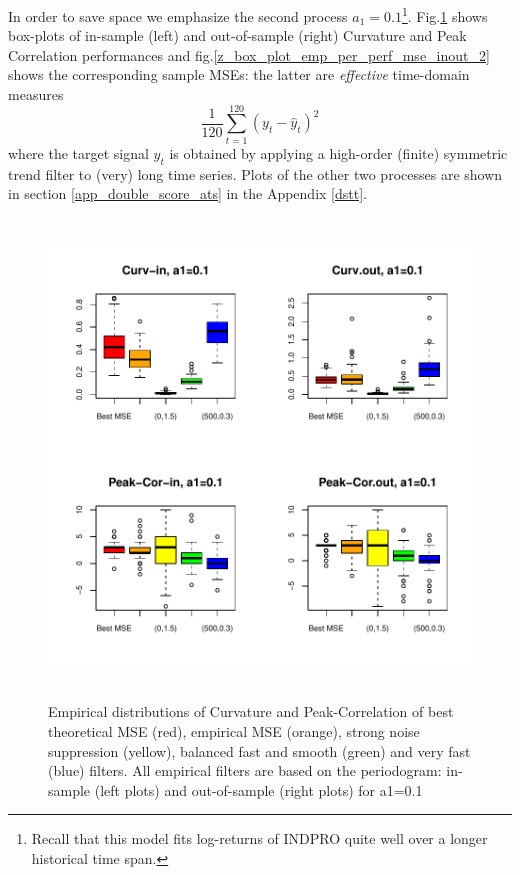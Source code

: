 \documentclass[a4paper]{book}
\begin{document}
In order to save space we emphasize the second process $a_1=0.1$\footnote{Recall that this model fits log-returns of INDPRO quite well over a longer historical time span.}. Fig.\ref{z_box_plot_emp_per_perf_inout_2}  shows box-plots of in-sample (left) and out-of-sample (right) Curvature and Peak Correlation performances and fig.\ref{z_box_plot_emp_per_perf_mse_inout_2}  shows the corresponding sample MSEs: the latter are \emph{effective} time-domain measures
\[\frac{1}{120}\sum_{t=1}^{120}(y_t-\hat{y}_t)^2\]
where the target signal $y_t$ is obtained by applying a high-order (finite) symmetric trend filter to (very) long time series. Plots of the other two processes are shown in  section \ref{app_double_score_ats} in the Appendix \ref{dstt}.


\begin{figure}[H]\begin{center}\includegraphics[height=5in, width=5in]{z_box_plot_emp_per_perf_inout_2}\caption{Empirical distributions
  of Curvature and Peak-Correlation of best theoretical MSE (red), empirical MSE (orange), strong noise suppression (yellow), balanced fast and smooth (green) and very fast (blue) filters. All empirical filters are based on the periodogram:
  in-sample (left plots) and out-of-sample (right plots) for a1=0.1\label{z_box_plot_emp_per_perf_inout_2}}\end{center}\end{figure}
\end{document}
